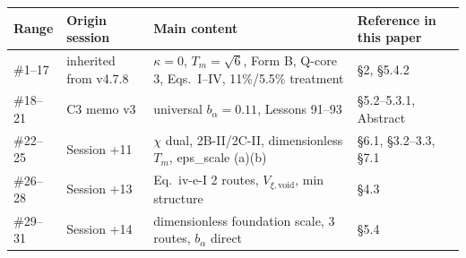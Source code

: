 \documentclass[11pt,a4paper]{article}
\newcommand{\Vxivoid}{V_{\xi,\mathrm{void}}}
\newcommand{\Tm}{T_{m}}
\newcommand{\bal}{b_{\alpha}}
\begin{document}
\begin{center}\small
\begin{tabularx}{\linewidth}{@{}l l >{\raggedright\arraybackslash}X >{\raggedright\arraybackslash}X@{}}
\toprule
Range & Origin session & Main content & Reference in this paper \\
\midrule
\#1--17 & inherited from v4.7.8 & $\kappa = 0$, $\Tm = \sqrt{6}$, Form B, Q-core 3, Eqs.~I--IV, 11\%/5.5\% treatment & \S 2, \S 5.4.2 \\
\#18--21 & C3 memo v3 & universal $\bal = 0.11$, Lessons 91--93 & \S 5.2--5.3.1, Abstract \\
\#22--25 & Session +11 & $\chi$ dual, 2B-II/2C-II, dimensionless $\Tm$, eps\_scale (a)(b) & \S 6.1, \S 3.2--3.3, \S 7.1 \\
\#26--28 & Session +13 & Eq.~iv-e-I 2 routes, $\Vxivoid$, min structure & \S 4.3 \\
\#29--31 & Session +14 & dimensionless foundation scale, 3 routes, $\bal$ direct & \S 5.4 \\
\bottomrule
\end{tabularx}
\end{center}
\end{document}
